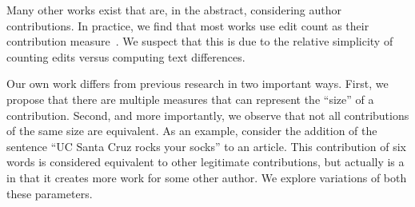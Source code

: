 Many other works exist that are, in the abstract, considering
author contributions.  In practice, we find that most works
use edit count as their contribution
measure~\cite{Wilkinson2007,Burke2008,Suh2008,Ortega2007,Stein2007,Ortega2009}.
We suspect that this is due to the relative simplicity of
counting edits versus computing text differences.

Our own work differs from previous research in two important ways.
First, we propose that there are multiple measures that
can represent the ``size'' of a contribution.
Second, and more importantly, we observe that not all
contributions of the same size are equivalent.
As an example, consider the addition of the sentence ``UC Santa
Cruz rocks your socks'' to an article.
This contribution of six words is considered equivalent to other
legitimate contributions, but actually is a 
in that it creates more work for some other author.
We explore variations of both these parameters.

